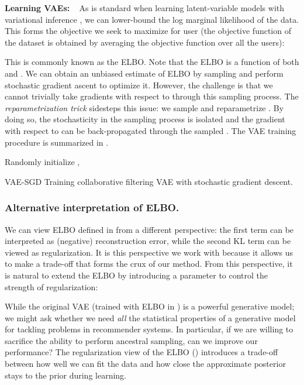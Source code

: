 \documentclass[sigconf]{acmart}
\DeclareRobustCommand{\parhead}[1]{\textbf{#1}~}
\begin{document}
\parhead{Learning \glspl{VAE}: } 
As is standard when learning latent-variable models with variational inference \citep{doi:10.1080/01621459.2017.1285773}, we can
lower-bound the log marginal likelihood of the data. This forms the objective we seek to maximize 
for user  (the objective function of the dataset is obtained by averaging the objective function over all the users):

This is commonly known as the \gls{ELBO}. Note that the \gls{ELBO} is a function of both  and . We can obtain an unbiased estimate of \gls{ELBO} by sampling  and perform stochastic gradient ascent to optimize it. However, the challenge is that we cannot trivially take gradients with respect to  through this sampling process. The \emph{reparametrization trick} \citep{kingma2013auto,rezende2014stochastic} sidesteps this issue: we sample  and reparametrize . By doing so, the stochasticity in the sampling process is isolated and the gradient with respect to  can be back-propagated through the sampled . The \gls{VAE} training procedure is summarized in .

\begin{algorithm}
\DontPrintSemicolon {}
Randomly initialize , \;
\Return{, }\;
\caption{{\sc VAE-SGD} Training collaborative filtering \gls{VAE} with stochastic gradient descent.}
\label{alg:vae}
\end{algorithm}

\subsubsection{Alternative interpretation of \gls{ELBO}.} \label{sec:reg}
We can view \gls{ELBO} defined in  from a different perspective: the first term can be interpreted as (negative) reconstruction error, while 
the second KL term can be viewed as regularization. It is this perspective we work with because it allows us to make a trade-off that forms the crux of our method.  
From this perspective, it is natural to extend the \gls{ELBO} by introducing a parameter  to control the strength of regularization:


While the original \gls{VAE} (trained with \gls{ELBO} in ) is a powerful generative model;
we might ask whether
we need \emph{all} the statistical properties of a generative model for tackling problems in recommender systems. 
In particular, if we are willing to sacrifice the ability to perform ancestral sampling, can we improve our performance?
The regularization view of the \gls{ELBO} () introduces a trade-off between how well we can fit the data and 
how close the approximate posterior stays to the prior during learning.
\end{document}
